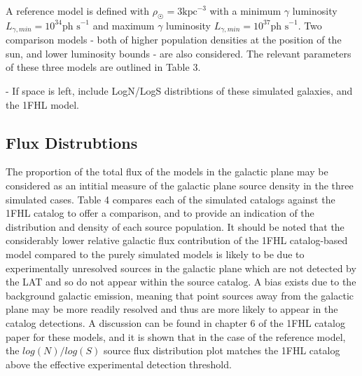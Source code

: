 \documentclass{PoS}
\begin{document}
A reference model is defined with $\rho_{\astrosun} = 3 \text{kpc}^{-3}$ with a minimum $\gamma$ luminosity $L_{\gamma, min} = 10^{34} \text{ph s}^{-1}$ and maximum $\gamma$ luminosity $L_{\gamma, min} = 10^{37} \text{ph s}^{-1}$. Two comparison models - both of higher population densities at the position of the sun, and lower luminosity bounds - are also considered. The relevant parameters of these three models are outlined in Table 3.

\begin{table}
\centering
{}
\caption{Parameters for 10 - 500 GeV Galaxy Population Simulations.}
\end{table}

- If space is left, include LogN/LogS distribtions of these simulated galaxies, and the 1FHL model.

\subsection{Flux Distrubtions}

The proportion of the total flux of the models in the galactic plane may be considered as an intitial measure of the galactic plane source density in the three simulated cases. Table 4 compares each of the simulated catalogs against the 1FHL catalog to offer a comparison, and to provide an indication of the distribution and density of each source population. It should be noted that the considerably lower relative galactic flux contribution of the 1FHL catalog-based model compared to the purely simulated models is likely to be due to experimentally unresolved sources in the galactic plane which are not detected by the LAT and so do not appear within the source catalog. A bias exists due to the background galactic emission, meaning that point sources away from the galactic plane may be more readily resolved and thus are more likely to appear in the catalog detections. A discussion can be found in chapter 6 of the 1FHL catalog paper \cite[p.59]{1fhl} for these models, and it is shown that in the case of the reference model, the $log(N)/log(S)$ source flux distribution plot matches the 1FHL catalog above the effective experimental detection threshold.
\end{document}
